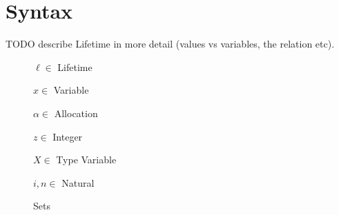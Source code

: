 \documentclass{article}
\begin{document}
\newcommand{\imm}{\textrm{imm}}
\newcommand{\mut}{\textrm{mut}}
\newcommand{\zah}{\textrm{int}}
\newcommand{\pay}{\textrm{pay}}
\newcommand{\unroll}{\textrm{unroll}}
\newcommand{\roll}{\textrm{roll}}
\newcommand{\void}{\textrm{void}}
\newcommand{\slot}{\textrm{slot}}
\newcommand{\uninit}{\textrm{uninit}}
\newcommand{\hole}{\textrm{hole}}
\newcommand{\init}{\textrm{init}}

\newcommand{\Own}[1]{\sim {#1}}
\newcommand{\Ref}[3]{\&\ {#1}\ {#2}\ {#3}}
\newcommand{\Var}[2]{\langle {#1} \rangle_{#2}}
\newcommand{\Rec}[2]{[ {#1} ]_{#2}}
\newcommand{\Fix}[2]{\mu {#1}.{#2}}

\newcommand{\Base}{\cdot}
\newcommand{\Deref}[1]{*\ {#1}}
\newcommand{\Proj}[3]{{#1}\cdot_{#2} {#3}}
\newcommand{\Pay}[1]{\pay\ {#1}}
\newcommand{\Unroll}[2]{\unroll\ [{#1}]\ {#2}}

\newcommand{\OwnVal}[2]{\Own{{#1}\ {#2}}}
\newcommand{\Slot}[1]{\slot\ {#1}}
\newcommand{\VarVal}[3]{\langle {#1} : {#2} \rangle_{#3}}
\newcommand{\Roll}[2]{\roll\ [{#1}]\ {#2}}

\newcommand{\RefVal}[2]{\&\ {#1}\ {#2}}
\newcommand{\Hole}[1]{\hole\ {#1}}

\newcommand{\Subst}[3]{[{#1} \mapsto {#2}]{#3}}

\newcommand{\Type}[3]{{#1} \vdash {#2} : {#3}}
\newcommand{\PType}[4]{\Type{{#1}}{{#2}\ {#3}}{{#4}}}
\newcommand{\RTType}[4]{\Type{{#1} ;{#2}}{{#3}}{{#4}}}
\newcommand{\ARType}[5]{\RTType{{#1}}{{#2}}{{#3}\ {#4}}{{#5}}}
\newcommand{\Read}[4]{\textsc{read}({#1},{#2},{#3},{#4})}
\newcommand{\HWF}[3]{\vdash {#1} : {#2} ; {#3}}
\newcommand{\SWF}[3]{{#1}; {#2} \vdash {#3}}
\newcommand{\YWF}[2]{\vdash {#1} : {#2}}
\newcommand{\Shallow}[4]{\textsc{shallow}({#1},{#2},{#3},{#4})}
\newcommand{\Eval}[3]{{#1} \vdash {#2} \rightarrow {#3}}
\newcommand{\PEval}[6]{\Eval{{#1};{#2}}{{#3}\ {#4}}{{#5}\ {#6}}}

\section{Syntax}

TODO describe Lifetime in more detail (values vs variables, the relation etc).

\begin{figure}[H]
  $\ell \in $ Lifetime

  $x \in $ Variable

  $\alpha \in $ Allocation

  $z \in $ Integer

  $X \in $ Type Variable

  $i,n \in $ Natural
  \caption{Sets}
\end{figure}
\end{document}
